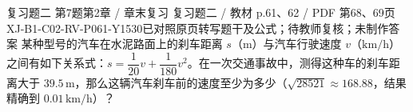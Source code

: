 \par\noindent\begin{minipage}{\linewidth}
\begin{bankitem}{复习题二 第7题}{第2章 / 章末复习 复习题二 / 教材 p.61、62 / PDF 第68、69页}{XJ-B1-C02-RV-P061-Y1530}{已对照原页转写题干及公式；待教师复核；未制作答案}
某种型号的汽车在水泥路面上的刹车距离 $s$（$\mathrm m$）与汽车行驶速度 $v$（$\mathrm{km/h}$）之间有如下关系式：$s=\dfrac1{20}v+\dfrac1{180}v^2$。在一次交通事故中，测得这种车的刹车距离大于 $39.5\,\mathrm m$，那么这辆汽车刹车前的速度至少为多少（$\sqrt{28521}\approx168.88$，结果精确到 $0.01\,\mathrm{km/h}$）？
\end{bankitem}
\end{minipage}\par\medskip
